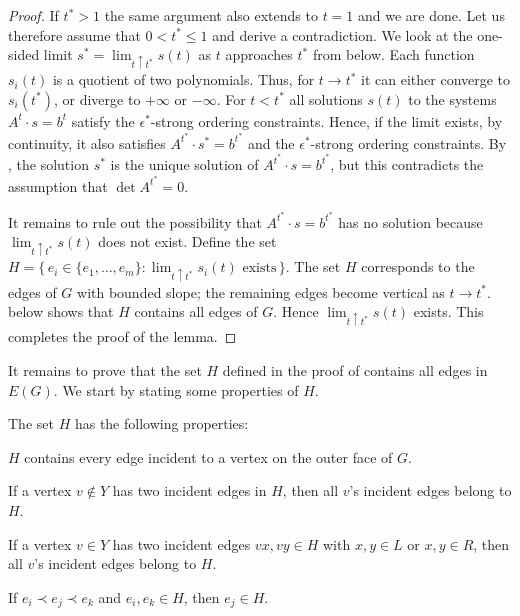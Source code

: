 \begin{proof}
	If $t^*>1$ the same argument also extends to $t=1$ and we are done.
	Let us therefore assume that $0<t^*\le 1$ and derive a contradiction.
	We look at the one-sided limit $s^*=\lim_{t\uparrow t^*}
	s(t)$
as $t$ approaches $t^*$ from below.
	Each function $s_i(t)$ is a quotient of two polynomials.
	Thus, for $t\to t^*$ it can either converge to $s_i(t^*)$, or diverge to $+\infty$ or $-\infty$.
	For $t<t^*$ all solutions $s(t)$ to the systems $A^t\cdot s=b^t$ satisfy the $\epsilon^*$-strong ordering constraints.
	Hence, if the limit exists, by continuity, it also satisfies $A^{t^*}\cdot s^*=b^{t^*}$
	and the $\epsilon^*$-strong ordering constraints.
	By , the solution $s^*$ is
	the unique solution
	of $A^{t^*}\cdot s=b^{t^*}$, but this contradicts the assumption
	that $\det A^{t^*}= 0$.
	
	It remains to rule out the possibility that
	$A^{t^*}\cdot s=b^{t^*}$ has no solution because
	$\lim_{t\uparrow t^*} s(t)$ does not exist.  Define the set $H=\{\,e_i\in
	\{e_1,\ldots,e_m\}:\text{$\lim_{t\uparrow t^*} s_i(t)$ exists}\,\}$.
	The set $H$ corresponds to the edges of $G$
	with bounded slope; the remaining edges become vertical as $t\to t^*$.
	 below shows that $H$ contains all edges of $G$. Hence $\lim_{t\uparrow t^*} s(t)$ exists. This completes the proof of the lemma.
\end{proof}


It remains to prove that the set $H$ defined in the proof of  contains all edges in $E(G)$. We start by stating some properties of $H$.

	\begin{prop}
		The set   $H$ has the following properties: 
		\begin{compactenum}[(PR1)]
			\item $H$ contains every edge incident to a vertex on the outer face of $G$.
			\item \label{off-C}
			If a vertex $v\not\in Y$ has two incident edges in
			$H$,
			then all $v$'s incident edges belong to $H$.
			\item \label{on-C}
			If a vertex $v\in Y$ has two incident edges $vx,vy\in H$ with $x,y\in L$ or $x,y\in R$, then all $v$'s incident edges belong to $H$.
			\item If $e_i \prec e_j \prec e_k$ and $e_i,e_k\in H$, 
			then $e_j\in H$.
		\end{compactenum}
	\end{prop}
		
